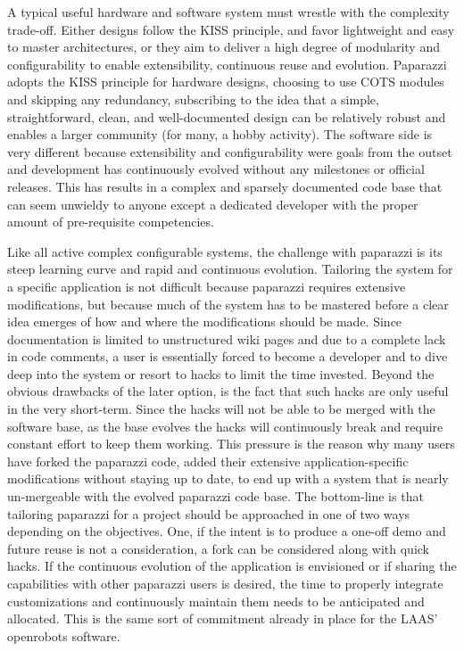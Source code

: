 \documentclass[a4paper,11pt]{report}
\begin{document}
A typical useful hardware and software system must wrestle with the complexity trade-off. Either designs follow the KISS principle, and favor lightweight and easy to master architectures, or they aim to deliver a high degree of modularity and configurability to enable extensibility, continuous reuse and evolution. Paparazzi adopts the KISS principle for hardware designs, choosing to use COTS modules and skipping any redundancy, subscribing to the idea that a simple, straightforward, clean, and well-documented design can be relatively robust and enables a larger community (for many, a hobby activity). The software side is very different because extensibility and configurability were goals from the outset and development has continuously evolved without any milestones or official releases. This has results in a complex and sparsely documented code base that can seem unwieldy to anyone except a dedicated developer with the proper amount of pre-requisite competencies.

Like all active complex configurable systems, the challenge with paparazzi is its steep learning curve and rapid and continuous evolution. Tailoring the system for a specific application is not difficult because paparazzi requires extensive modifications, but because much of the system has to be mastered before a clear idea emerges of how and where the modifications should be made. Since documentation is limited to unstructured wiki pages and due to a complete lack in code comments, a user is essentially forced to become a developer and to dive deep into the system or resort to hacks to limit the time invested. Beyond the obvious drawbacks of the later option, is the fact that such hacks are only useful in the very short-term. Since the hacks will not be able to be merged with the software base, as the base evolves the hacks will continuously break and require constant effort to keep them working. This pressure is the reason why many users have forked the paparazzi code, added their extensive application-specific modifications without staying up to date, to end up with a system that is nearly un-mergeable with the evolved paparazzi code base. The bottom-line is that tailoring paparazzi for a project should be approached in one of two ways depending on the objectives. One, if the intent is to produce a one-off demo and future reuse is not a consideration, a fork can be considered along with quick hacks. If the continuous evolution of the application is envisioned or if sharing the capabilities with other paparazzi users is desired, the time to properly integrate customizations and continuously maintain them needs to be anticipated and allocated. This is the same sort of commitment already in place for the LAAS' openrobots software.
\end{document}
